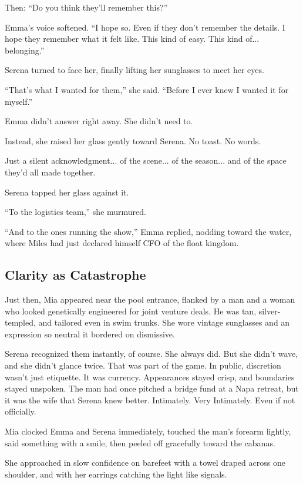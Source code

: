 Then: ``Do you think they’ll remember this?''

Emma’s voice softened. ``I hope so. Even if they don’t remember the details. I hope they remember what it 
felt like. This kind of easy. This kind of... belonging.''

Serena turned to face her, finally lifting her sunglasses to meet her eyes.

``That’s what I wanted for them,'' she said. ``Before I ever knew I wanted it for myself.''

Emma didn’t answer right away. She didn’t need to.

Instead, she raised her glass gently toward Serena.  
No toast. No words.

Just a silent acknowledgment... of the scene... of the season... and of the space they’d all made together.

Serena tapped her glass against it.

``To the logistics team,'' she murmured.

``And to the ones running the show,'' Emma replied, nodding toward the water, where Miles had just declared 
himself CFO of the float kingdom.

\subsection{Clarity as Catastrophe}


Just then, Mia appeared near the pool entrance, flanked by a man and a woman who looked genetically engineered for 
joint venture deals. He was tan, silver-templed, and tailored even in swim trunks. She wore vintage sunglasses and 
an expression so neutral it bordered on dismissive. 

Serena recognized them instantly, of course. She always did. But she didn’t wave, and she didn’t glance twice. That 
was part of the game. In public, discretion wasn’t just etiquette. It was currency. Appearances stayed crisp, and 
boundaries stayed unspoken. The man had once pitched a bridge fund at a Napa retreat, but it was the wife that Serena 
knew better. Intimately. Very Intimately. Even if not officially. 

Mia clocked Emma and Serena immediately, touched the man’s forearm lightly, said something with a smile, then peeled 
off gracefully toward the cabanas.

She approached in slow confidence on barefeet with a towel draped across one shoulder, and with her earrings catching 
the light like signals.

